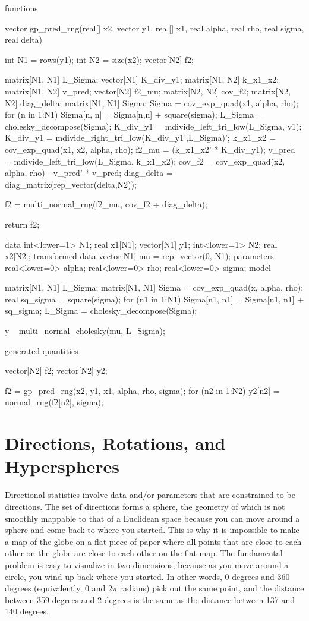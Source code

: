 \begin{stancode}
functions {
  vector gp_pred_rng(real[] x2,
                     vector y1,
                     real[] x1,
                     real alpha,
                     real rho,
                     real sigma,
                     real delta) {
    int N1 = rows(y1);
    int N2 = size(x2);
    vector[N2] f2;

    {
      matrix[N1, N1] L_Sigma;
      vector[N1] K_div_y1;
      matrix[N1, N2] k_x1_x2;
      matrix[N1, N2] v_pred;
      vector[N2] f2_mu;
      matrix[N2, N2] cov_f2;
      matrix[N2, N2] diag_delta;
      matrix[N1, N1] Sigma;
      Sigma = cov_exp_quad(x1, alpha, rho);
      for (n in 1:N1)
        Sigma[n, n] = Sigma[n,n] + square(sigma);
      L_Sigma = cholesky_decompose(Sigma);
      K_div_y1 = mdivide_left_tri_low(L_Sigma, y1);
      K_div_y1 = mdivide_right_tri_low(K_div_y1',L_Sigma)';
      k_x1_x2 = cov_exp_quad(x1, x2, alpha, rho);
      f2_mu = (k_x1_x2' * K_div_y1); 
      v_pred = mdivide_left_tri_low(L_Sigma, k_x1_x2);
      cov_f2 = cov_exp_quad(x2, alpha, rho) - v_pred' * v_pred;
      diag_delta = diag_matrix(rep_vector(delta,N2));

      f2 = multi_normal_rng(f2_mu, cov_f2 + diag_delta);
    }
    return f2;
  }
}
data {
  int<lower=1> N1;     
  real x1[N1]; 
  vector[N1] y1;
  int<lower=1> N2;
  real x2[N2];
}
transformed data {
  vector[N1] mu = rep_vector(0, N1);
}
parameters {
  real<lower=0> alpha;
  real<lower=0> rho;
  real<lower=0> sigma;
}
model {
  matrix[N1, N1] L_Sigma; 
  {
    matrix[N1, N1] Sigma = cov_exp_quad(x, alpha, rho);
    real sq_sigma = square(sigma);
    for (n1 in 1:N1)
      Sigma[n1, n1] = Sigma[n1, n1] + sq_sigma;
    L_Sigma = cholesky_decompose(Sigma);
  }

  y ~ multi_normal_cholesky(mu, L_Sigma);
}
generated quantities {
  vector[N2] f2;
  vector[N2] y2;

  f2 = gp_pred_rng(x2, y1, x1, alpha, rho, sigma);
  for (n2 in 1:N2)
    y2[n2] = normal_rng(f2[n2], sigma);
}
\end{stancode}

\chapter{Directions, Rotations, and Hyperspheres}

Directional statistics involve data and/or parameters that are
constrained to be directions.  The set of directions forms a sphere,
the geometry of which is not smoothly mappable to that of a Euclidean
space because you can move around a sphere and come back to where you
started.  This is why it is impossible to make a map of the globe on a
flat piece of paper where all points that are close to each other on
the globe are close to each other on the flat map.  The fundamental
problem is easy to visualize in two dimensions, because as you move
around a circle, you wind up back where you started.  In other words,
0 degrees and 360 degrees (equivalently, 0 and $2 \pi$ radians) pick
out the same point, and the distance between 359 degrees and 2 degrees
is the same as the distance between 137 and 140 degrees.

